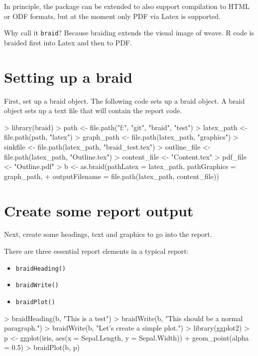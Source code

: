 \documentclass[a4paper]{article}
\newcommand{\braid}{{\tt braid}}
\newcommand{\code}[1]{{\tt #1}}
\begin{document}
In principle, the package can be extended to also support compilation to HTML or ODF formats, but at the moment only PDF via Latex is supported.

Why call it \braid{}?  Because braiding extends the visual image of weave. R code is braided first into Latex and then to PDF. 


\section{Setting up a braid}

First, set up a braid object.  The following code sets up a braid object.  A braid object sets up a text file that will contain the report code.

\begin{Schunk}
\begin{Sinput}
> library(braid)
> path <- file.path("f:", "git", "braid", "test")
> latex_path <- file.path(path, "latex")
> graph_path <- file.path(latex_path, "graphics")
> sinkfile <- file.path(latex_path, "braid_test.tex")
> outline_file <- file.path(latex_path, "Outline.tex")
> content_file <- "Content.tex"
> pdf_file <- "Outline.pdf"
> b <- as.braid(pathLatex = latex_path, pathGraphics = graph_path, 
+     outputFilename = file.path(latex_path, content_file))
\end{Sinput}
\end{Schunk}

\section{Create some report output}

Next, create some headings, text and graphics to go into the report.

There are three essential report elements in a typical report:

\begin{itemize}
	\item \code{braidHeading()}
	\item \code{braidWrite()}
	\item \code{braidPlot()}
\end{itemize}


\begin{Schunk}
\begin{Sinput}
> braidHeading(b, "This is a test")
> braidWrite(b, "This should be a normal paragraph.")
> braidWrite(b, "Let's create a simple plot.")
> library(ggplot2)
> p <- ggplot(iris, aes(x = Sepal.Length, y = Sepal.Width)) + geom_point(alpha = 0.5)
> braidPlot(b, p)
\end{Sinput}
\end{Schunk}
\end{document}
